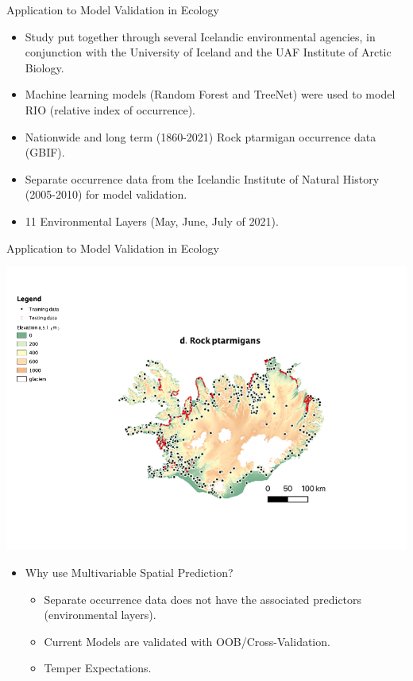 \documentclass[10pt]{beamer}
\begin{document}
\begin{frame}{Application to Model Validation in Ecology}
    \begin{itemize}
        \item Study put together through several Icelandic environmental agencies, in conjunction with the University of Iceland and the UAF Institute of 
        Arctic Biology. 
        \vfill
        \item Machine learning models (Random Forest and TreeNet) were used to model RIO (relative index of occurrence). 
        \vfill
        \item Nationwide and long term (1860-2021) Rock ptarmigan occurrence data (GBIF). 
        \vfill
        \item Separate occurrence data from the Icelandic Institute of Natural History (2005-2010) for model validation.
         \vfill
        \item 11 Environmental Layers (May, June, July of 2021).
    \end{itemize}
\end{frame}


\begin{frame}{Application to Model Validation in Ecology}
    \begin{center}
        \includegraphics[width = \textwidth]{RockPtarmigan.png}
    \end{center}
\end{frame}


\begin{frame}{}
    \begin{itemize}
        \item Why use Multivariable Spatial Prediction?
    \begin{itemize}
        \item Separate occurrence data does not have the associated predictors (environmental layers).
        \item Current Models are validated with OOB/Cross-Validation.
        \item Temper Expectations.
    \end{itemize}
\end{itemize}
\end{frame}
\end{document}
